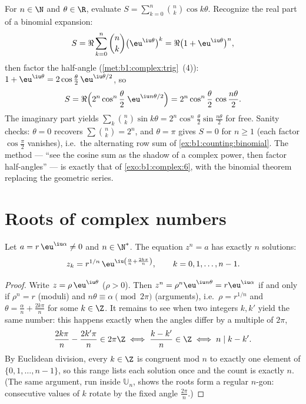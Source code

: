 \begin{example}\label{ex:b1:complex:binomsum}
For $n \in \N$ and $\theta \in \R$, evaluate $S =
\sum_{k=0}^{n}\binom nk \cos k\theta$. Recognize the real part of
a binomial expansion:
\[
S = \Re\sum_{k=0}^n \binom nk \bigl(\eu^{\iu\theta}\bigr)^k
= \Re\bigl(1 + \eu^{\iu\theta}\bigr)^n ,
\]
then factor the half-angle (\cref{met:b1:complex:trig}~(4)): $1 +
\eu^{\iu\theta} = 2\cos\frac\theta2\,\eu^{\iu\theta/2}$, so
\[
S = \Re\Bigl(2^n\cos^n\frac\theta2\;\eu^{\iu n\theta/2}\Bigr)
= 2^n \cos^n\frac\theta2\,\cos\frac{n\theta}2 .
\]
The imaginary part yields $\sum_k\binom nk\sin k\theta =
2^n\cos^n\frac\theta2\sin\frac{n\theta}2$ for free. Sanity checks:
$\theta = 0$ recovers $\sum\binom nk = 2^n$, and $\theta = \pi$
gives $S = 0$ for $n \geq 1$ (each factor $\cos\frac\pi2$
vanishes), i.e.\ the alternating row sum of
\cref{ex:b1:counting:binomial}. The method --- ``see the cosine
sum as the shadow of a complex power, then factor half-angles''
--- is exactly that of \cref{exo:b1:complex:6}, with the binomial
theorem replacing the geometric series.
\end{example}

\section{Roots of complex numbers}

\begin{theorem}[$n$-th roots]\label{thm:b1:complex:roots}
Let $a = r\,\eu^{\iu\alpha} \neq 0$ and $n \in \N^*$. The equation
$z^n = a$ has exactly $n$ solutions:
\[
z_k = r^{1/n}\, \eu^{\iu\left(\frac{\alpha}{n} +
\frac{2k\pi}{n}\right)},
\qquad k = 0, 1, \dots, n - 1 .
\]
\end{theorem}

\begin{proof}
Write $z = \rho\,\eu^{\iu\theta}$ ($\rho > 0$). Then $z^n =
\rho^n \eu^{\iu n\theta} = r \eu^{\iu\alpha}$ if and only if $\rho^n
= r$ (moduli) and $n\theta \equiv \alpha \pmod{2\pi}$ (arguments),
i.e.\ $\rho = r^{1/n}$ and $\theta = \frac{\alpha}{n} +
\frac{2k\pi}{n}$ for some $k \in \Z$. It remains to see when two
integers $k, k'$ yield the same number: this happens exactly when
the angles differ by a multiple of $2\pi$,
\[
\frac{2k\pi}n - \frac{2k'\pi}n \in 2\pi\Z
\iff \frac{k - k'}n \in \Z
\iff n \mid k - k' .
\]
By Euclidean division, every $k \in \Z$ is congruent mod $n$ to
exactly one element of $\{0, 1, \dots, n-1\}$, so this range lists
each solution once and the count is exactly $n$. (The same
argument, run inside $\mathbb U_n$, shows the roots form a regular
$n$-gon: consecutive values of $k$ rotate by the fixed angle
$\frac{2\pi}n$.)
\end{proof}


